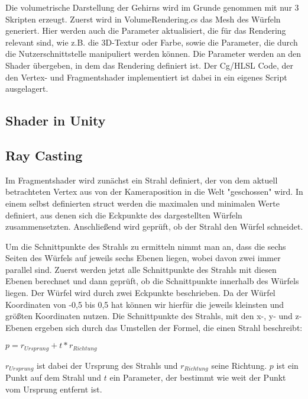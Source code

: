 Die volumetrische Darstellung der Gehirns wird im Grunde genommen mit nur 3 Skripten erzeugt. Zuerst wird in VolumeRendering.cs das Mesh des Würfeln generiert. Hier werden auch die Parameter aktualisiert, die für das Rendering relevant sind, wie z.B. die 3D-Textur oder Farbe, sowie die Parameter, die durch die Nutzerschnittstelle manipuliert werden können. 
Die Parameter werden an den Shader übergeben, in dem das Rendering definiert ist. Der Cg/HLSL Code, der den Vertex- und Fragmentshader implementiert ist dabei in ein eigenes Script ausgelagert.

\subsection{Shader in Unity}

\subsection{Ray Casting}

Im Fragmentshader wird zunächst ein Strahl definiert, der von dem aktuell betrachteten Vertex aus von der Kameraposition in die Welt "geschossen" wird. In einem selbst definierten struct werden die maximalen und minimalen Werte definiert, aus denen sich die Eckpunkte des dargestellten Würfeln zusammensetzten. Anschließend wird geprüft, ob der Strahl den Würfel schneidet. 

Um die Schnittpunkte des Strahls zu ermitteln nimmt man an, dass die sechs Seiten des Würfels auf jeweils sechs Ebenen liegen, wobei davon zwei immer parallel sind. Zuerst werden jetzt alle Schnittpunkte des Strahls mit diesen Ebenen berechnet und dann geprüft, ob die Schnittpunkte innerhalb des Würfels liegen.
Der Würfel wird durch zwei Eckpunkte beschrieben. Da der Würfel Koordinaten von -0,5 bis 0,5 hat können wir hierfür die jeweils kleinsten und größten Koordinaten nutzen. 
Die Schnittpunkte des Strahls, mit den x-, y- und z-Ebenen ergeben sich durch das Umstellen der Formel, die einen Strahl beschreibt:

$p=r_{Ursprung}+t*r_{Richtung}$

$r_{Ursprung}$ ist dabei der Ursprung des Strahls und $r_{Richtung}$ seine Richtung. $p$ ist ein Punkt auf dem Strahl und $t$ ein Parameter, der bestimmt wie weit der Punkt vom Ursprung entfernt ist.

